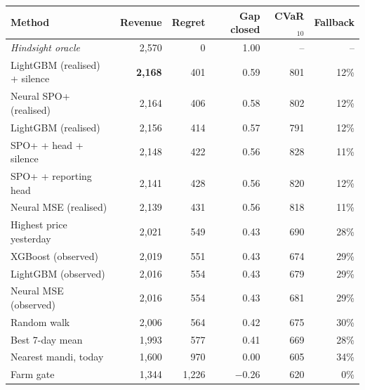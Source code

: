 \begin{tabular}{lrrrrr}
\toprule
Method & Revenue & Regret & Gap closed & CVaR$_{10}$ & Fallback\\
\midrule
\emph{Hindsight oracle} & 2{,}570 & 0 & 1.00 & -- & --\\
\midrule
LightGBM (realised) + silence & \textbf{2{,}168} & 401 & 0.59 & 801 & 12\%\\
Neural SPO+ (realised) & 2{,}164 & 406 & 0.58 & 802 & 12\%\\
LightGBM (realised) & 2{,}156 & 414 & 0.57 & 791 & 12\%\\
SPO+ + head + silence & 2{,}148 & 422 & 0.56 & 828 & 11\%\\
SPO+ + reporting head & 2{,}141 & 428 & 0.56 & 820 & 12\%\\
Neural MSE (realised) & 2{,}139 & 431 & 0.56 & 818 & 11\%\\
\midrule
Highest price yesterday & 2{,}021 & 549 & 0.43 & 690 & 28\%\\
XGBoost (observed) & 2{,}019 & 551 & 0.43 & 674 & 29\%\\
LightGBM (observed) & 2{,}016 & 554 & 0.43 & 679 & 29\%\\
Neural MSE (observed) & 2{,}016 & 554 & 0.43 & 681 & 29\%\\
Random walk & 2{,}006 & 564 & 0.42 & 675 & 30\%\\
\midrule
Best 7-day mean & 1{,}993 & 577 & 0.41 & 669 & 28\%\\
Nearest mandi, today & 1{,}600 & 970 & 0.00 & 605 & 34\%\\
Farm gate & 1{,}344 & 1{,}226 & $-$0.26 & 620 & 0\%\\
\bottomrule
\end{tabular}